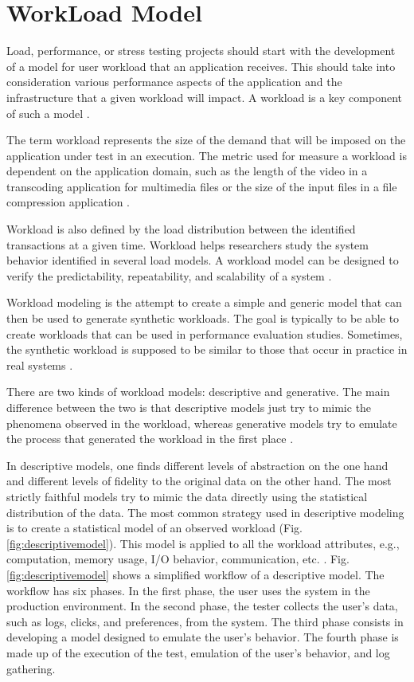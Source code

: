 \documentclass[times]{stvrauth}
\begin{document}
\section{WorkLoad Model}

Load, performance, or stress testing projects should start with the development of a model for user workload that an application receives. This should take into consideration various performance aspects of the application and the infrastructure that a given workload will impact. A workload is a key component of such a model \cite{Molyneaux2009}.

The term workload represents the size of the demand that will be imposed on the application under test in an execution. The metric  used for measure a workload is dependent on the application domain, such as the length of the video in a transcoding application for multimedia files or the size of the input files in a file compression application \cite{Feitelson2013} \cite{Molyneaux2009} \cite{Goncalves2014}. 

Workload is also defined by the load distribution between the identified transactions at a given time. Workload helps researchers study the system behavior identified in several load models. A workload model can be designed to verify the predictability, repeatability, and scalability of a system \cite{Feitelson2013} \cite{Molyneaux2009}.


Workload modeling is the attempt to create a simple and generic model that can then be used to generate synthetic workloads. The goal is typically to be able to create workloads that can be used in performance evaluation studies. Sometimes, the synthetic workload is supposed to be similar to those that occur in practice in real systems \cite{Feitelson2013} \cite{Molyneaux2009}.

There are two kinds of workload models: descriptive and generative. The main difference between the two is that descriptive models just try to mimic the phenomena observed in the workload, whereas generative models try to emulate the process that generated the workload in the first place \cite{DiLucca2006}. 

In descriptive models, one finds different levels of abstraction on the one hand and different levels of fidelity to the original data on the other hand. The most strictly faithful models try to mimic the data directly using the statistical distribution of the data. The most common strategy used in descriptive modeling is to create a statistical model of an observed workload (Fig. \ref{fig:descriptivemodel}). This model is applied to all the workload attributes, e.g., computation, memory usage, I/O behavior, communication, etc. \cite{DiLucca2006}. Fig. \ref{fig:descriptivemodel} shows a simplified workflow of a descriptive model. The workflow has six phases. In the first phase, the user uses the system in the production environment. In the second phase, the tester collects the user's data, such as logs, clicks, and preferences, from the system. The third phase consists in developing a model designed to emulate the user's behavior. The fourth phase is made up of the execution of the test, emulation of the user's behavior, and log gathering.
\end{document}
